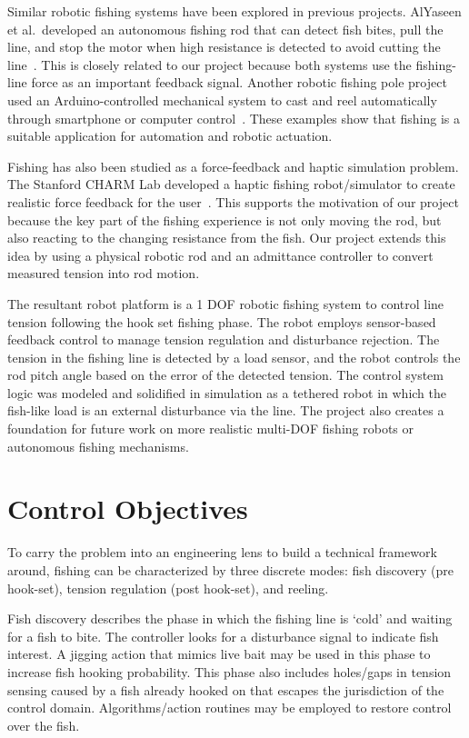 \documentclass[conference]{IEEEtran}
\begin{document}
Similar robotic fishing systems have been explored in previous projects. AlYaseen et al.\ developed an autonomous fishing rod that can detect fish bites, pull the line, and stop the motor when high resistance is detected to avoid cutting the line~\cite{b1}. This is closely related to our project because both systems use the fishing-line force as an important feedback signal. Another robotic fishing pole project used an Arduino-controlled mechanical system to cast and reel automatically through smartphone or computer control~\cite{b2}. These examples show that fishing is a suitable application for automation and robotic actuation.

Fishing has also been studied as a force-feedback and haptic simulation problem. The Stanford CHARM Lab developed a haptic fishing robot/simulator to create realistic force feedback for the user~\cite{b3}. This supports the motivation of our project because the key part of the fishing experience is not only moving the rod, but also reacting to the changing resistance from the fish. Our project extends this idea by using a physical robotic rod and an admittance controller to convert measured tension into rod motion.

The resultant robot platform is a 1 DOF robotic fishing system to control line tension following the hook set fishing phase. The robot employs sensor-based feedback control to manage tension regulation and disturbance rejection. The tension in the fishing line is detected by a load sensor, and the robot controls the rod pitch angle based on the error of the detected tension. The control system logic was modeled and solidified in simulation as a tethered robot in which the fish-like load is an external disturbance via the line. The project also creates a foundation for future work on more realistic multi-DOF fishing robots or autonomous fishing mechanisms.

\section{Control Objectives}
To carry the problem into an engineering lens to build a technical framework around, fishing can be characterized by three discrete modes: fish discovery (pre hook-set), tension regulation (post hook-set), and reeling.

Fish discovery describes the phase in which the fishing line is ‘cold’ and waiting for a fish to bite. The controller looks for a disturbance signal to indicate fish interest. A jigging action that mimics live bait may be used in this phase to increase fish hooking probability. This phase also includes holes/gaps in tension sensing caused by a fish already hooked on that escapes the jurisdiction of the control domain. Algorithms/action routines may be employed to restore control over the fish.
\end{document}
